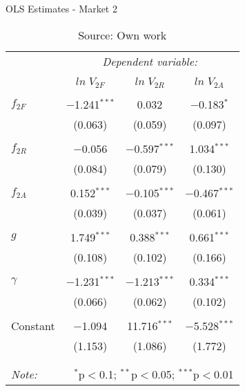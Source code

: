 
\begin{table}[!htbp] \centering 
  \caption{OLS Estimates - Market 2} 
  \label{} 
\begin{tabular}{@{\extracolsep{5pt}}lccc} 
\toprule 
 & \multicolumn{3}{c}{\textit{Dependent variable:}} \\ 
\cline{2-4} 
\\[-1.8ex] & $ln \; V_{2F}$ & $ln \; V_{2R}$ & $ln \; V_{2A}$ \\ 
\hline \\[-1.8ex] 
 $f_{2F}$ & $-$1.241$^{***}$ & 0.032 & $-$0.183$^{*}$ \\ 
  & (0.063) & (0.059) & (0.097) \\ 
  & & & \\ 
 $f_{2R}$ & $-$0.056 & $-$0.597$^{***}$ & 1.034$^{***}$ \\ 
  & (0.084) & (0.079) & (0.130) \\ 
  & & & \\ 
 $f_{2A}$ & 0.152$^{***}$ & $-$0.105$^{***}$ & $-$0.467$^{***}$ \\ 
  & (0.039) & (0.037) & (0.061) \\ 
  & & & \\ 
 $g$ & 1.749$^{***}$ & 0.388$^{***}$ & 0.661$^{***}$ \\ 
  & (0.108) & (0.102) & (0.166) \\ 
  & & & \\ 
 $\gamma$ & $-$1.231$^{***}$ & $-$1.213$^{***}$ & 0.334$^{***}$ \\ 
  & (0.066) & (0.062) & (0.102) \\ 
  & & & \\ 
 Constant & $-$1.094 & 11.716$^{***}$ & $-$5.528$^{***}$ \\ 
  & (1.153) & (1.086) & (1.772) \\ 
  & & & \\ 
\hline 
\hline \\[-1.8ex] 
\textit{Note:}  & \multicolumn{3}{r}{$^{*}$p$<$0.1; $^{**}$p$<$0.05; $^{***}$p$<$0.01} \\ 
\bottomrule 
\end{tabular}
\caption*{Source: Own work} 
\end{table} 
